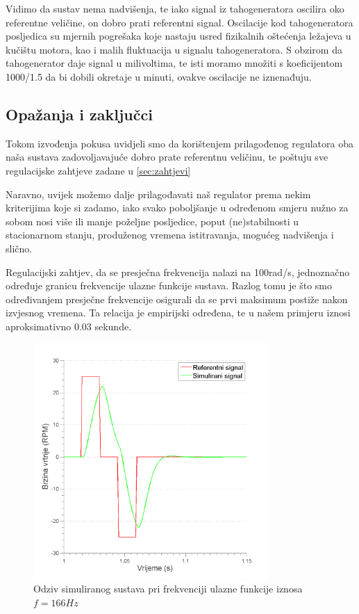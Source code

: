 \documentclass[12pt,a4paper]{article}
\begin{document}
\newpage

Vidimo da sustav nema nadvišenja, te iako signal iz tahogeneratora oscilira oko referentne veličine, on dobro prati referentni signal.
Oscilacije kod tahogeneratora posljedica su mjernih pogrešaka koje nastaju usred fizikalnih oštećenja ležajeva u kučištu motora, kao i malih fluktuacija u signalu tahogeneratora. S obzirom da tahogenerator daje signal u milivoltima, te isti moramo množiti s koeficijentom 1000/1.5 da bi dobili okretaje u minuti, ovakve oscilacije ne iznenađuju.


\subsection{Opažanja i zaključci}

Tokom izvođenja pokusa uvidjeli smo da korištenjem prilagođenog regulatora oba naša sustava zadovoljavajuće dobro prate referentnu veličinu, te poštuju sve regulacijske zahtjeve zadane u \ref{sec:zahtjevi}

Naravno, uvijek možemo dalje prilagođavati naš regulator prema nekim kriterijima koje si zadamo, iako svako poboljšanje u određenom smjeru nužno za sobom nosi više ili manje poželjne posljedice, poput (ne)stabilnosti u stacionarnom stanju, produženog vremena istitravanja, mogućeg nadvišenja i slično.

Regulacijski zahtjev, da se presječna frekvencija nalazi na 100rad/s, jednoznačno određuje granicu frekvencije ulazne funkcije sustava. Razlog tomu je što smo određivanjem presječne frekvencije osigurali da se prvi maksimum postiže nakon izvjesnog vremena. Ta relacija je empirijski određena, te u našem primjeru iznosi aproksimativno 0.03 sekunde.


\begin{figure}[!h]
	\begin{center}
	\includegraphics[width=0.8\textwidth]{ogranicenje_2.png}
    \caption{Odziv simuliranog sustava pri frekvenciji ulazne funkcije iznosa $f=166 Hz$}
    \end{center}
\end{figure}
\end{document}
